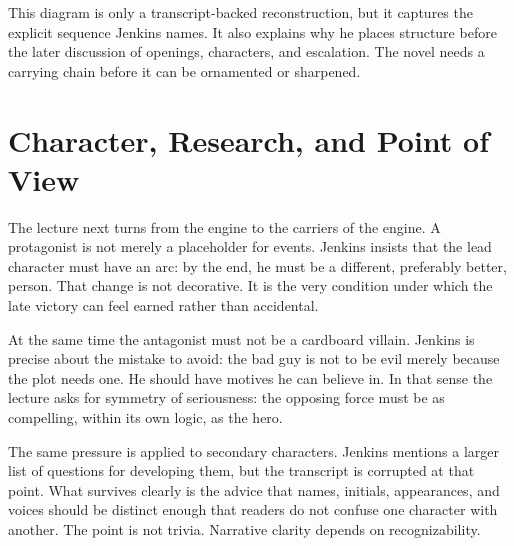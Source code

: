 \begin{figure}
\centering
{}
\end{figure}

This diagram is only a transcript-backed reconstruction, but it captures the explicit sequence Jenkins names. It also explains why he places structure before the later discussion of openings, characters, and escalation. The novel needs a carrying chain before it can be ornamented or sharpened.

\section{Character, Research, and Point of View}

The lecture next turns from the engine to the carriers of the engine. A protagonist is not merely a placeholder for events. Jenkins insists that the lead character must have an arc: by the end, he must be a different, preferably better, person. That change is not decorative. It is the very condition under which the late victory can feel earned rather than accidental.

At the same time the antagonist must not be a cardboard villain. Jenkins is precise about the mistake to avoid: the bad guy is not to be evil merely because the plot needs one. He should have motives he can believe in. In that sense the lecture asks for symmetry of seriousness: the opposing force must be as compelling, within its own logic, as the hero.

The same pressure is applied to secondary characters. Jenkins mentions a larger list of questions for developing them, but the transcript is corrupted at that point. What survives clearly is the advice that names, initials, appearances, and voices should be distinct enough that readers do not confuse one character with another. The point is not trivia. Narrative clarity depends on recognizability.

